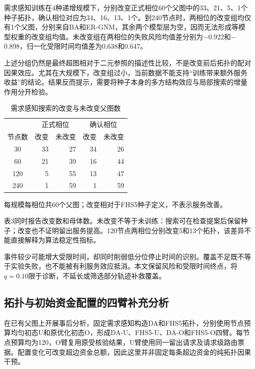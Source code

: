 \documentclass[UTF8,a4paper,twocolumn,fontset=none,zihao=5]{ctexart}
\begin{document}
需求感知训练在4种递增规模下，分别改变正式相位60个父图中的33、21、5、1个种子拓扑，确认相位对应为34、16、13、1个。到240节点时，两相位的改变组均仅有1个父图，分别来自BA和ER-GNM，其余两个模型层为空，因而无法形成等模型权重的改变组均值。未改变组在两相位的失败风险均值差分别为$-$0.922和$-$0.898，归一化受限时间均值差为0.638和0.647。


上述分组仍然是最终超图相对于二元参照的描述性比较，不是改变前后拓扑的配对因果效应。尤其在大规模下，改变组过小，当前数据不能支持“训练带来额外服务收益”的结论。结果反而提示，需要将种子本身的多方结构效应与局部搜索的增量作用分开检验。


\begin{table}[t]\centering
\caption{需求感知搜索的改变与未改变父图数}\label{tab:3}
\small\begin{tabular*}{\columnwidth}{@{\extracolsep{\fill}}crrrr}\toprule
&\multicolumn{2}{c}{正式相位}&\multicolumn{2}{c}{确认相位}\\
节点数&改变&未改变&改变&未改变\\\midrule
30 & 33 & 27 & 34 & 26\\
60 & 21 & 39 & 16 & 44\\
120 & 5 & 55 & 13 & 47\\
240 & 1 & 59 & 1 & 59\\
\bottomrule\end{tabular*}
\par\smallskip\footnotesize 每规模每相位共60个父图；改变相对于FHS5种子定义，不表示服务改善。
\end{table}

表3同时报告改变数和母体数。未改变不等于未训练：搜索可在检查提案后保留种子；改变也不证明留出服务提高。120节点两相位分别改变5和13个拓扑，该差异不能直接解释为算法稳定性指标。


事件较少可能增大受限时间，却同时削弱低分位停止时间的识别。覆盖不足既不等于实验失败，也不能被有利服务效应抵消。本文保留风险和受限时间终点，将$q=0.10$限于诊断，不延长或筛选部分轨迹补救覆盖。


\subsection{拓扑与初始资金配置的四臂补充分析}

在已有父图上开展事后分析，固定需求感知构造DA和FHS5拓扑，分别使用节点预算均匀初态U和原优化初态O，形成DA-U、FHS5-U、DA-O和FHS5-O四臂。每节点预算均为120，O臂复用原受核验结果，U臂使用同一留出请求及请求级路由票据。配置变化可改变超边资金总额，因此这里并非固定每条超边资金的纯拓扑因果干预。
\end{document}
